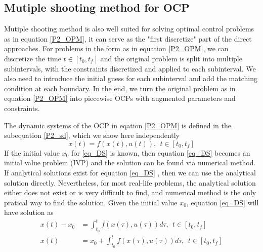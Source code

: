 \documentclass  [
  paper    = a4,
  BCOR     = 10mm,
  twoside,
  fontsize = 12pt,
  fleqn,
  toc      = bibnumbered,
  toc      = listofnumbered,
  numbers  = noendperiod,
  headings = normal,
  listof   = leveldown,
  version  = 3.03
]                                       {scrreprt}
\newcommand{\<}{\langle}
\renewcommand{\>}{\rangle}
\begin{document}
\subsection{Mutiple shooting method for OCP}
\label{Sec_MS_OCP}
Mutiple shooting method is also well suited for solving optimal control problems as in equation \ref{P2_OPM}, it can serve as the "first discretize" part of the direct approaches. For problems in the form as in equation \ref{P2_OPM}, we can discretize the time $t \in [t_0, t_f]$ and the original problem is split into multiple subintervals, with the constraints discretized and applied to each subinterval. We also need to introduce the initial guess for each subinterval and add the matching condition at each boundary. In the end, we turn the original problem as in equation  \ref{P2_OPM} into piecewise OCPs with augmented parameters and constraints. 

The dynamic systems of the OCP in eqation \ref{P2_OPM} is defined in the subequation 
\ref{P2_sd}, which we show here independently
\begin{equation}
	\dot{x} (t) = f(x(t), u(t)), \ \   t \in [t_0, t_f]
	\label{eq_DS}
\end{equation}
If the initial value $x_0$ for \ref{eq_DS} is known, then equation \ref{eq_DS} becomes an initial value problem (IVP) and the solution can be found via numerical method. If analytical solutions exist for equation \ref{eq_DS} , then we can use the analytical solution directly. Nevertheless, for most real-life problems, the analytical solution either does not exist or is very difficult to find, and numerical method is the only pratical way to find the solution. Given the initial value $x_0$, equation \ref{eq_DS} will have solution as 
\begin{equation}\label{eq_diffSolution}
	\begin{aligned}
		x(t) -  x_0  &= \int_{t_0}^{t}  f(x(\tau), u(\tau)) d \tau,   \ \ t \in [t_0, t_f] \\ 
		x(t) & = x_0  + \int_{t_0}^{t}  f(x(\tau), u(\tau)) d \tau,   \ \ t \in [t_0, t_f] 
	\end{aligned}
\end{equation}
\end{document}
